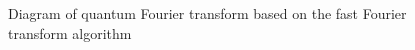 \begin{figure}
\centering



\caption{Diagram of quantum Fourier transform based on the fast Fourier transform algorithm}
\label{figQuantCompQuantFourier}
\end{figure}